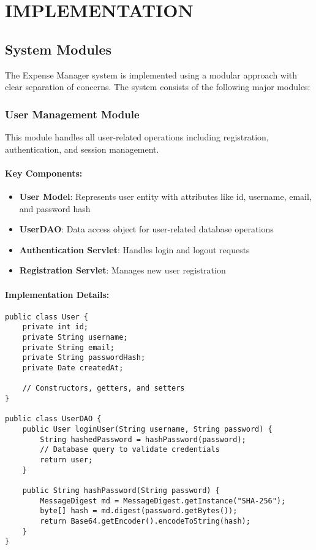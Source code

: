 \chapter{IMPLEMENTATION}

\section{System Modules}

The Expense Manager system is implemented using a modular approach with clear separation of concerns. The system consists of the following major modules:

\subsection{User Management Module}

This module handles all user-related operations including registration, authentication, and session management.

\subsubsection{Key Components:}
\begin{itemize}
    \item \textbf{User Model}: Represents user entity with attributes like id, username, email, and password hash
    \item \textbf{UserDAO}: Data access object for user-related database operations
    \item \textbf{Authentication Servlet}: Handles login and logout requests
    \item \textbf{Registration Servlet}: Manages new user registration
\end{itemize}

\subsubsection{Implementation Details:}
\begin{lstlisting}[caption=User Authentication Implementation]
public class User {
    private int id;
    private String username;
    private String email;
    private String passwordHash;
    private Date createdAt;
    
    // Constructors, getters, and setters
}

public class UserDAO {
    public User loginUser(String username, String password) {
        String hashedPassword = hashPassword(password);
        // Database query to validate credentials
        return user;
    }
    
    public String hashPassword(String password) {
        MessageDigest md = MessageDigest.getInstance("SHA-256");
        byte[] hash = md.digest(password.getBytes());
        return Base64.getEncoder().encodeToString(hash);
    }
}
\end{lstlisting}

